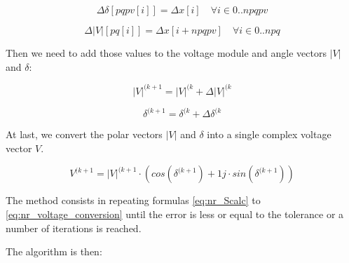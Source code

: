 \documentclass[a4paper,twoside,fleqn]{tufte-book}
\begin{document}
\begin{equation}
\Delta \delta[pqpv[i]] = \Delta x[i]  \quad \forall i \in {0..npqpv}
\label{eq:nr_dd1}
\end{equation}

\begin{equation}
\Delta  |V|[pq[i]] = \Delta x[i+npqpv]  \quad \forall i \in {0..npq}
\end{equation}

Then we need to add those values to the voltage module and angle vectors $|V|$ and $\delta$:


\begin{equation}
|V|^{(k+1} = |V|^{(k} + \Delta |V|^{(k}
\end{equation}

\begin{equation}
\delta^{(k+1} = \delta^{(k} + \Delta \delta^{(k}
\end{equation}

At last, we convert the polar vectors  $|V|$ and $\delta$ into a single complex voltage vector $V$.

\begin{equation}
V^{(k+1} = |V|^{(k+1} \cdot \left( cos(\delta^{(k+1}) + 1j \cdot sin(\delta^{(k+1})\right)
\label{eq:nr_voltage_conversion}
\end{equation}

The method consists in repeating formulas \ref{eq:nr_Scalc} to \ref{eq:nr_voltage_conversion} until the error is less or equal to the tolerance or a number of iterations is reached.

The algorithm is then:
\end{document}
